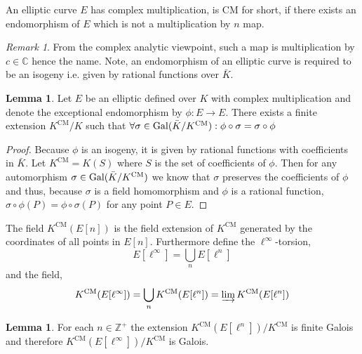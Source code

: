 \documentclass[12pt]{article}
\newcommand{\Z}{\mathbb{Z}}
\newcommand{\C}{\mathbb{C}}
\newcommand{\Gal}[1]{\mathrm{Gal} \small(#1 \small)}
\theoremstyle{remark}
\newtheorem*{remark}{Remark}
\theoremstyle{definition}
\newtheorem{lemma}[theorem]{Lemma}
\newenvironment{definition}[1][Definition:]{\begin{trivlist}
\item[\hskip \labelsep {\bfseries #1}]}{\end{trivlist}}
\begin{document}
\begin{definition}
An elliptic curve $E$ has complex multiplication, is CM for short, if there exists an endomorphism of $E$ which is not a multiplication by $n$ map. 
\end{definition}

\begin{remark}
From the complex analytic viewpoint, such a map is multiplication by $c \in \C$ hence the name. Note, an endomorphism of an elliptic curve is required to be an isogeny i.e. given by rational functions over $\bar{K}$. 
\end{remark}

\newcommand{\CM}{\mathrm{CM}}

\begin{lemma}
Let $E$ be an elliptic defined over $K$ with complex multiplication and denote the exceptional endomorphism by $\phi : E \to E$. There exists a finite extension $K^{\CM} / K$ such that $\forall \sigma \in \Gal{\bar{K} / K^{\CM}} : \phi \circ \sigma = \sigma \circ \phi$   
\end{lemma}

\begin{proof}
Because $\phi$ is an isogeny, it is given by rational functions with coefficients in $\bar{K}$. Let $K^{\CM} = K(S)$ where $S$ is the set of coefficients of $\phi$. Then for any automorphism $\sigma \in \Gal{\bar{K} / K^{\CM}}$ we know that $\sigma$ preserves the coefficients of $\phi$ and thus, because $\sigma$ is a field homomorphism and $\phi$ is a rational function, $\sigma \circ \phi(P) = \phi \circ \sigma(P)$ for any point $P \in E$.  
\end{proof}

\begin{definition}
The field $K^{\CM}(E[n])$ is the field extension of $K^{\CM}$ generated by the coordinates of all points in $E[n]$. Furthermore define the $\ell^\infty$-torsion,
\[ E[\ell^\infty] = \bigcup_{n} E[\ell^n] \]
and the field,
\[ K^{\CM}(E[\ell^\infty]) = \bigcup_{n} K^{\CM} (E[\ell^n]) = \varinjlim K^{\CM}(E[\ell^n]) \]
\end{definition}

\begin{lemma}
For each $n \in \Z^{+}$ the extension $K^{\CM} (E[\ell^n]) / K^{\CM}$ is finite Galois and therefore $K^{\CM} (E[\ell^\infty]) / K^{\CM}$ is Galois.
\end{lemma}
\end{document}
